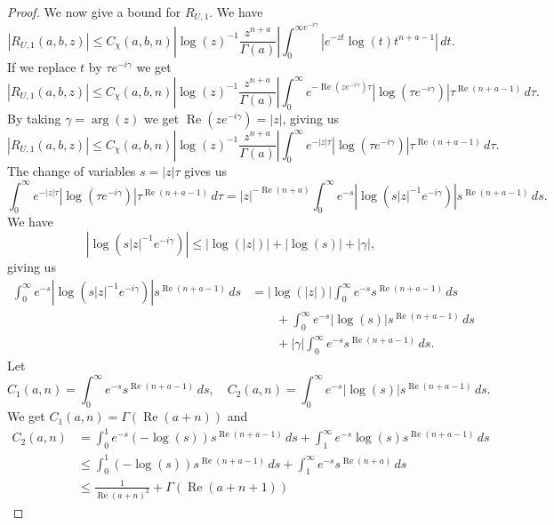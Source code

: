 \documentclass[11pt]{article}
\DeclareMathOperator{\real}{Re}
\begin{document}
\begin{proof}
  We now give a bound for \(R_{U,1}\). We have
  \begin{equation*}
    |R_{U,1}(a, b, z)|
    \leq C_{\chi}(a, b, n)\left|\log(z)^{-1}\frac{z^{n + a}}{\Gamma(a)}\right| \int_{0}^{\infty e^{-i\gamma}}\left|
      e^{-zt}\log(t)t^{n + a - 1}
    \right|\,dt.
  \end{equation*}
  If we replace \(t\) by \(\tau e^{-i\gamma}\) we get
  \begin{equation*}
    |R_{U,1}(a, b, z)|
    \leq C_{\chi}(a, b, n)\left|\log(z)^{-1}\frac{z^{n + a}}{\Gamma(a)}\right| \int_{0}^{\infty}
    e^{-\real(ze^{-i\gamma})\tau}|\log(\tau e^{-i\gamma})|\tau^{\real(n + a - 1)}\,d\tau.
  \end{equation*}
  By taking \(\gamma = \arg(z)\) we get \(\real(ze^{-i\gamma}) = |z|\), giving us
  \begin{equation*}
    |R_{U,1}(a, b, z)|
    \leq C_{\chi}(a, b, n)\left|\log(z)^{-1}\frac{z^{n + a}}{\Gamma(a)}\right| \int_{0}^{\infty}
    e^{-|z|\tau}|\log(\tau e^{-i\gamma})|\tau^{\real(n + a - 1)}\,d\tau.
  \end{equation*}
  The change of variables \(s = |z|\tau\) gives us
  \begin{equation*}
    \int_{0}^{\infty} e^{-|z|\tau}|\log(\tau e^{-i\gamma})|\tau^{\real(n + a - 1)}\,d\tau
    = |z|^{-\real(n +  a)}\int_{0}^{\infty} e^{-s}|\log(s|z|^{-1}e^{-i\gamma})|s^{\real(n + a - 1)}\,ds.
  \end{equation*}
  We have
  \begin{equation*}
    |\log(s|z|^{-1}e^{-i\gamma})| \leq |\log(|z|)| + |\log(s)| + |\gamma|,
  \end{equation*}
  giving us
  \begin{align*}
    \int_{0}^{\infty} e^{-s}|\log(s|z|^{-1}e^{-i\gamma})|s^{\real(n + a - 1)}\,ds
    &= |\log(|z|)|\int_{0}^{\infty} e^{-s}s^{\real(n + a - 1)}\,ds\\
    &\qquad+ \int_{0}^{\infty} e^{-s}|\log(s)|s^{\real(n + a - 1)}\,ds\\
    &\qquad+ |\gamma|\int_{0}^{\infty} e^{-s}s^{\real(n + a - 1)}\,ds.
  \end{align*}
  Let
  \begin{equation*}
    C_{1}(a, n) = \int_{0}^{\infty} e^{-s}s^{\real(n + a - 1)}\,ds,\quad
    C_{2}(a, n) = \int_{0}^{\infty} e^{-s}|\log(s)|s^{\real(n + a - 1)}\,ds.
  \end{equation*}
  We get \(C_{1}(a, n) = \Gamma(\real(a + n))\) and
  \begin{align*}
    C_{2}(a, n)
    &= \int_{0}^{1} e^{-s}(-\log(s))s^{\real(n + a - 1)}\,ds
      + \int_{1}^{\infty} e^{-s}\log(s)s^{\real(n + a - 1)}\,ds\\
    &\leq \int_{0}^{1} (-\log(s))s^{\real(n + a - 1)}\,ds
      + \int_{1}^{\infty} e^{-s}s^{\real(n + a)}\,ds\\
    &\leq \frac{1}{\real(a + n)^{2}} + \Gamma(\real(a + n + 1))
  \end{align*}


\end{proof}
\end{document}
